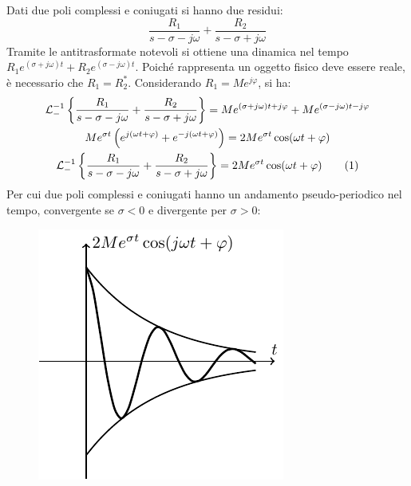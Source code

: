 \documentclass{article}
\numberwithin{equation}{subsection}
\newcommand{\tageq}{\tag{\stepcounter{equation}\theequation}}
\begin{document}
Dati due poli complessi e coniugati si hanno due residui: 
\begin{equation*}
    \displaystyle\frac{R_1}{s-\sigma-j\omega}+\frac{R_2}{s-\sigma+j\omega}
\end{equation*}
Tramite le antitrasformate notevoli si 
ottiene una dinamica nel tempo $R_1e^{(\sigma+j\omega)t}+R_2e^{(\sigma-j\omega)t}$. Poiché rappresenta un oggetto fisico deve essere reale, è necessario che $R_1=R^*_2$. 
Considerando $R_1=Me^{j\varphi}$, si ha:
\begin{gather*}
    \mathcal{L}_-^{-1}\left\{\displaystyle\frac{R_1}{s-\sigma-j\omega}+\frac{R_2}{s-\sigma+j\omega}\right\}=Me^{(\sigma+j\omega)t+j\varphi}+Me^{(\sigma-j\omega)t-j\varphi}\\
    Me^{\sigma t}\left(e^{j(\omega t+\varphi)}+e^{-j(\omega t+\varphi)}\right)=2Me^{\sigma t}\cos(\omega t+\varphi)\\
    \mathcal{L}_-^{-1}\left\{\displaystyle\frac{R_1}{s-\sigma-j\omega}+\frac{R_2}{s-\sigma+j\omega}\right\}=2Me^{\sigma t}\cos(\omega t+\varphi)\tageq
\end{gather*}
Per cui due poli complessi e coniugati hanno un andamento pseudo-periodico nel tempo, convergente se $\sigma<0$ e divergente per $\sigma>0$:  
\begin{figure}[H]%
    \centering
    \includegraphics{smorzato.pdf}%
\end{figure}
\end{document}
